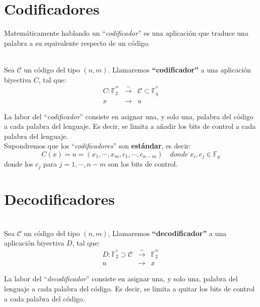 \section{Codificadores}\label{sec:Codificadores}

Matem\'aticamente hablando un ``\emph{codificador}'' es una aplicaci\'on que
traduce una palabra a su equivalente respecto de un c\'odigo.
\begin{definicion}[Codificador]
\ \\
Sea $\mathcal{C}$ un c\'odigo del tipo $(n,m)$. Llamaremos
\textbf{``codificador''} a una aplicaci\'on biyectiva $C$, tal que:
\begin{eqnarray*}
C: \mathbb{F}^{^m}_2 &\stackrel{\sim}\longrightarrow& \mathcal{C}\subset \mathbb{F}^{^n}_q \\
 x &\longrightarrow & u
\end{eqnarray*}
\end{definicion}
La labor del ``\emph{codificador}'' consiste en asignar una, y solo una, palabra
del c\'odigo a cada palabra del lenguaje. Es decir, se limita a a\~nadir los
bits de control a cada palabra del lenguaje.\\

Supondremos que los ``\emph{codificadores}'' son \textbf{est\'andar}, es decir:
\begin{displaymath}
C(x)=u=(x_1,\cdots,x_m,c_1,\cdots,c_{n-m})\quad donde\ x_i,c_j\in \mathbb{F}_q
\end{displaymath}
donde los $c_j$ para $j=1,\cdots,n-m$ son los bits de control.

\section{Decodificadores} \label{sec:Decodificadores}
\begin{definicion}[Decodificador]
\ \\
Sea $\mathcal{C}$ un c\'odigo del tipo $(n,m)$, Llamaremos
\textbf{``decodificador''} a una aplicaci\'on biyectiva $D$, tal que:
\begin{eqnarray*}
D:\mathbb{F}^{^n}_2 \supset \mathcal{C}&\stackrel{\sim}\longrightarrow & \mathbb{F}^{^m}_2 \\
 u&\longrightarrow & x
\end{eqnarray*}
\end{definicion}
La labor del ``\emph{decodificador}'' consiste en asignar una, y solo una,
palabra del lenguaje a cada palabra del c\'odigo. Es decir, se limita a quitar
los bits de control a cada palabra del c\'odigo.
%
\newpage
%
